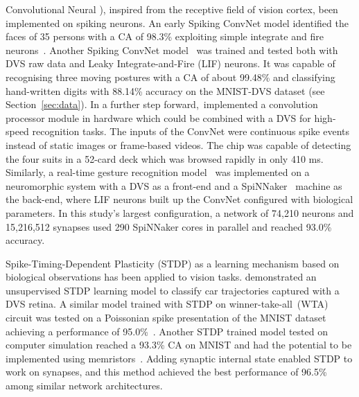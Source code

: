 Convolutional Neural \DIFdelbegin {}\DIFdelend \DIFaddbegin {}\DIFaddend ), inspired from the receptive field of vision cortex, \DIFdelbegin {}\DIFdelend \DIFaddbegin {}\DIFaddend been implemented on spiking neurons.
An early Spiking ConvNet model identified the faces of 35 persons with a CA of 98.3\% exploiting simple integrate and fire neurons~\citep{matsugu2002convolutional}.
Another Spiking ConvNet model~\citep{zhao2014feedforward} was trained and tested both with DVS raw data and Leaky Integrate-and-Fire (LIF) neurons.
It was capable of recognising three moving postures with a CA of about 99.48\% and classifying hand-written digits with 88.14\% accuracy on the MNIST-DVS dataset (see Section~\ref{sec:data}).
In a further step forward,~\DIFdelbegin {}\DIFdelend \DIFaddbegin {}\DIFaddend implemented a convolution processor module in hardware which could be combined with a DVS for high-speed recognition tasks.
The inputs of the ConvNet were continuous spike events instead of static images or frame-based videos. 
The chip was capable of detecting the four suits in a 52-card deck which was browsed rapidly in only 410 ms.
Similarly, a real-time gesture recognition model~\citep{liu2014real} was implemented on a neuromorphic system with a DVS as a front-end and a SpiNNaker~\citep{furber2014spinnaker} machine as the back-end, where LIF neurons built up the ConvNet configured with biological parameters.
In this study's largest configuration, a network of 74,210 neurons and 15,216,512 synapses used 290 SpiNNaker cores in parallel and reached 93.0\% accuracy. 

Spike-Timing-Dependent Plasticity (STDP) as a learning mechanism based on biological observations has been applied to vision tasks.
\DIFdelbegin {}\DIFdelend \DIFaddbegin {}\DIFaddend demonstrated an unsupervised STDP learning model to classify car trajectories captured with a DVS retina. 
A similar model trained with STDP on winner-take-all~(WTA) circuit was tested on a Poissonian spike presentation of the MNIST dataset achieving a performance of 95.0\%~\citep{diehl2015unsupervised}.
Another STDP trained model tested on computer simulation reached a 93.3\% CA on MNIST and had the potential to be implemented using memristors~\citep{bill2014compound}. 
Adding synaptic internal state enabled STDP to work on \DIFdelbegin {}\DIFdelend \DIFaddbegin {}\DIFaddend synapses, and this method achieved the best performance of 96.5\% among similar network architectures. 

